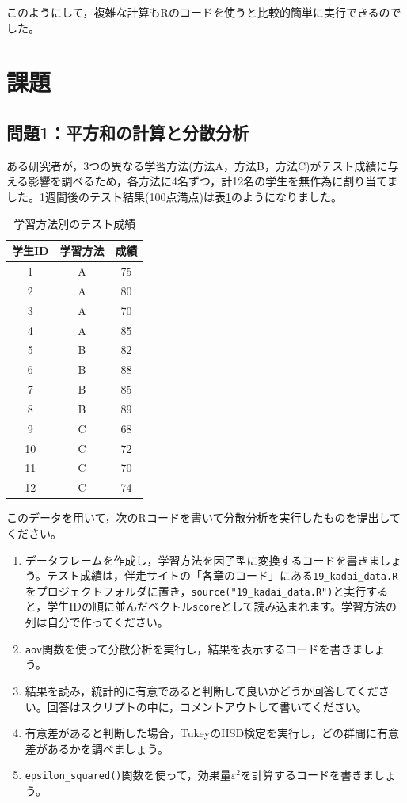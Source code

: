 \documentclass{ltjbook}
\begin{document}
このようにして，複雑な計算もRのコードを使うと比較的簡単に実行できるのでした。

\section{課題}

\subsection{問題1：平方和の計算と分散分析}

ある研究者が，3つの異なる学習方法(方法A，方法B，方法C)がテスト成績に与える影響を調べるため，各方法に4名ずつ，計12名の学生を無作為に割り当てました。1週間後のテスト結果(100点満点)は表\ref{tbl:19_02}のようになりました。

\begin{table}[ht]
	\centering
	\caption{学習方法別のテスト成績}
	\begin{tabular}{ccc}
		\hline
		学生ID & 学習方法 & 成績 \\
		\hline
		1 & A & 75 \\
		2 & A & 80 \\
		3 & A & 70 \\
		4 & A & 85 \\
		5 & B & 82 \\
		6 & B & 88 \\
		7 & B & 85 \\
		8 & B & 89 \\
		9 & C & 68 \\
		10 & C & 72 \\
		11 & C & 70 \\
		12 & C & 74 \\
		\hline
	\end{tabular}
	\label{tbl:19_02}
\end{table}
このデータを用いて，次のRコードを書いて分散分析を実行したものを提出してください。
\begin{enumerate}
	\item データフレームを作成し，学習方法を因子型に変換するコードを書きましょう。テスト成績は，伴走サイトの「各章のコード」にある\texttt{19\_kadai\_data.R}をプロジェクトフォルダに置き，\verb|source("19_kadai_data.R")|と実行すると，学生IDの順に並んだベクトル\verb|score|として読み込まれます。学習方法の列は自分で作ってください。
	\item \texttt{aov}関数を使って分散分析を実行し，結果を表示するコードを書きましょう。
	\item 結果を読み，統計的に有意であると判断して良いかどうか回答してください。回答はスクリプトの中に，コメントアウトして書いてください。
	\item 有意差があると判断した場合，TukeyのHSD検定を実行し，どの群間に有意差があるかを調べましょう。
	\item \verb|epsilon_squared()|関数を使って，効果量$\varepsilon^2$を計算するコードを書きましょう。
\end{enumerate}
\end{document}
